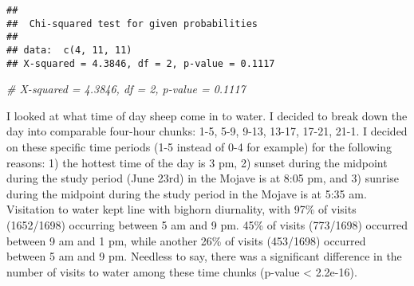\documentclass[]{article}
\newenvironment{Shaded}{\begin{snugshade}}{\end{snugshade}}
\newcommand{\CommentTok}[1]{\textcolor[rgb]{0.56,0.35,0.01}{\textit{#1}}}
\begin{document}
\begin{verbatim}
## 
##  Chi-squared test for given probabilities
## 
## data:  c(4, 11, 11)
## X-squared = 4.3846, df = 2, p-value = 0.1117
\end{verbatim}

\begin{Shaded}
\begin{Highlighting}[]
\CommentTok{# X-squared = 4.3846, df = 2, p-value = 0.1117}
\end{Highlighting}
\end{Shaded}

I looked at what time of day sheep come in to water. I decided to break
down the day into comparable four-hour chunks: 1-5, 5-9, 9-13, 13-17,
17-21, 21-1. I decided on these specific time periods (1-5 instead of
0-4 for example) for the following reasons: 1) the hottest time of the
day is 3 pm, 2) sunset during the midpoint during the study period (June
23rd) in the Mojave is at 8:05 pm, and 3) sunrise during the midpoint
during the study period in the Mojave is at 5:35 am. Visitation to water
kept line with bighorn diurnality, with 97\% of visits (1652/1698)
occurring between 5 am and 9 pm. 45\% of visits (773/1698) occurred
between 9 am and 1 pm, while another 26\% of visits (453/1698) occurred
between 5 am and 9 pm. Needless to say, there was a significant
difference in the number of visits to water among these time chunks
(p-value \textless{} 2.2e-16).
\end{document}
